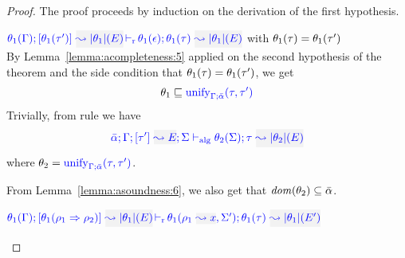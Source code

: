 \begin{proof}
The proof proceeds by induction on the derivation of the first hypothesis.
\begin{description}
\setlength{\itemsep}{1em}
\item[\fbox{\rref{M-Simp}}]\quad
$\dmres{\theta_1(\tenv)}{\theta_1(\type')}{\etrans{\theta_1}(E)}{\theta_1(\type)}{\etrans{\theta_1}(E)}{\theta_1(\epsilon)}$ \hfill with $\theta_1(\tau) = \theta_1(\tau')$ \\

By Lemma~\ref{lemma:acompleteness:5} applied on the second hypothesis of the theorem
and the side condition that $\theta_1(\tau) = \theta_1(\tau')$, we get
\begin{equation*}
  \theta_1\sqsubseteq{\color{blue} \mathrm{unify}_{\Gamma;\bar{\alpha}}(\tau,\tau')}
\end{equation*}
Trivially, from rule  we have
\begin{equation*}
  \admres{\bar\alpha}{\tenv}{\type'}{E}{\Sigma}{\type}{\etrans{\theta_2}(E)}{\theta_2(\Sigma)}
\end{equation*}
where $\theta_2 = {\color{blue} \mathrm{unify}_{\Gamma;\bar{\alpha}}(\tau,\tau')}$.

From Lemma~\ref{lemma:asoundness:6}, we also get that ${\it dom }{(\theta_2)}\subseteq\bar\alpha$.

\item[\fbox{\rref{M-IApp}}]\quad
$\dmres{\theta_1(\tenv)}{\theta_1(\rulet_1\To\rulet_2)}{\etrans{\theta_1}(E)}{\theta_1(\type)}{\etrans{\theta_1}(E')}{\theta_1(\ie{\rulet_1}{x},\Sigma')}$\ \\


\end{description}
\end{proof}
